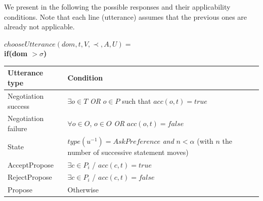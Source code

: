 \documentclass{llncs}
\begin{document}
				We present in the following the possible responses and their applicability conditions. Note that each line (utterance)  assumes that the previous ones are already not applicable.
				
				$ chooseUtterance(dom, t, V, \prec, A, U) = $ \\
				
				
				\textbf{if(\textbf{dom  $>\sigma$})} 
				\begin{table}
				\centering
			
				\begin{tabular}{|p{3cm}|p{9cm}|}
					\hline
					\textbf{Utterance type} & Condition \\
					\hline
					Negotiation success & $\exists o \in T$   \emph{OR} $o \in P$ such that  $acc(o,t) = true$ \\
					\hline
					Negotiation failure & $ \forall o \in O$,  $o \in O$  \emph{OR} $acc(o,t) = false$\\
					\hline
					State & $type(u^{-1}) = AskPreference$  \textit{ and }
					$n < \alpha$ (with $n$ the number of successive statement moves)\\
					\hline
					AcceptPropose & $\exists c \in P_i$ / $acc(c,t)= true$ \\
					\hline
					RejectPropose & $\exists c \in P_i$ / $acc(c,t)= false$ \\
					\hline
					Propose & Otherwise  \\
					
					\hline
				\end{tabular}
				\end{table}
		
\end{document}
